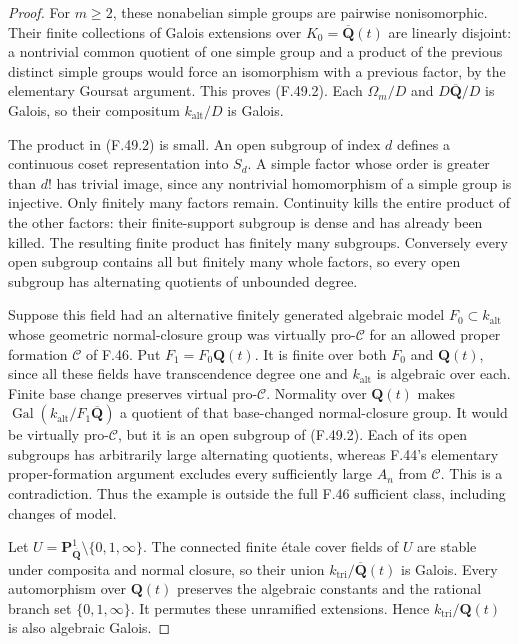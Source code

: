 \begin{proof}
For \(m\ge2\), these nonabelian simple groups are pairwise
nonisomorphic. Their finite collections of Galois extensions
over \(K_0=\overline{\mathbf Q}(t)\) are linearly disjoint:
a nontrivial common quotient of one simple group and a product
of the previous distinct simple groups would force an isomorphism
with a previous factor, by the elementary Goursat argument.
This proves (F.49.2).
Each \(\Omega_m/D\) and \(D\overline{\mathbf Q}/D\) is Galois,
so their compositum \(k_{\mathrm{alt}}/D\) is Galois.

The product in (F.49.2) is small. An open subgroup of index \(d\)
defines a continuous coset representation into \(S_d\).
A simple factor whose order is greater than \(d!\) has trivial
image, since any nontrivial homomorphism of a simple group
is injective. Only finitely many factors remain.
Continuity kills the entire product of the other factors:
their finite-support subgroup is dense and has already been killed.
The resulting finite product has finitely many subgroups.
Conversely every open subgroup contains all but finitely many
whole factors, so every open subgroup has alternating quotients
of unbounded degree.

Suppose this field had an alternative finitely generated
algebraic model \(F_0\subset k_{\mathrm{alt}}\) whose geometric
normal-closure group was virtually pro-\(\mathcal C\) for an
allowed proper formation \(\mathcal C\) of F.46.
Put \(F_1=F_0\mathbf Q(t)\).
It is finite over both \(F_0\) and \(\mathbf Q(t)\), since all
these fields have transcendence degree one and
\(k_{\mathrm{alt}}\) is algebraic over each.
Finite base change preserves virtual pro-\(\mathcal C\).
Normality over \(\mathbf Q(t)\) makes
\(\operatorname{Gal}(k_{\mathrm{alt}}/F_1\overline{\mathbf Q})\)
a quotient of that base-changed normal-closure group.
It would be virtually pro-\(\mathcal C\), but it is an open
subgroup of (F.49.2). Each of its open subgroups has arbitrarily
large alternating quotients, whereas F.44's elementary
proper-formation argument excludes every sufficiently large
\(A_n\) from \(\mathcal C\). This is a contradiction.
Thus the example is outside the full F.46 sufficient class,
including changes of model.

Let \(U=\mathbf P^1_{\overline{\mathbf Q}}\setminus\{0,1,\infty\}\).
The connected finite étale cover fields of \(U\) are stable
under composita and normal closure, so their union
\(k_{\mathrm{tri}}/\overline{\mathbf Q}(t)\) is Galois.
Every automorphism over \(\mathbf Q(t)\) preserves the algebraic
constants and the rational branch set \(\{0,1,\infty\}\).
It permutes these unramified extensions. Hence
\(k_{\mathrm{tri}}/\mathbf Q(t)\) is also algebraic Galois.


\end{proof}
